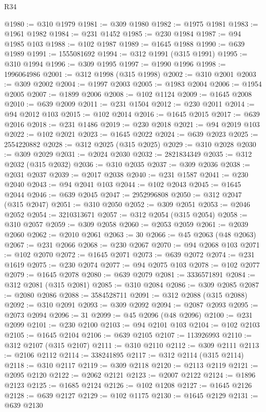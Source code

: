 \begin{lexlean}{R34}
\begin{coremodule}
@1980 := @310 @1979
@1981 := @309 @1980
@1982 := @1975 @1981
@1983 := @1961 @1982
@1984 := @231 @1452
@1985 := @230 @1984
@1987 := @94 @1985 @103
@1988 := @102 @1987
@1989 := @1645 @1988
@1990 := @639 @1989
@1991 := 1555081692
@1994 := @312 @1991 (@315 @1991)
@1995 := @310 @1994
@1996 := @309 @1995
@1997 := @1990 @1996
@1998 := 1996064986
@2001 := @312 @1998 (@315 @1998)
@2002 := @310 @2001
@2003 := @309 @2002
@2004 := @1997 @2003
@2005 := @1983 @2004
@2006 := @1954 @2005
@2007 := @1899 @2006
@2008 := @102 @1124
@2009 := @1645 @2008
@2010 := @639 @2009
@2011 := @231 @1504
@2012 := @230 @2011
@2014 := @94 @2012 @103
@2015 := @102 @2014
@2016 := @1645 @2015
@2017 := @639 @2016
@2018 := @231 @1486
@2019 := @230 @2018
@2021 := @94 @2019 @103
@2022 := @102 @2021
@2023 := @1645 @2022
@2024 := @639 @2023
@2025 := 2554220882
@2028 := @312 @2025 (@315 @2025)
@2029 := @310 @2028
@2030 := @309 @2029
@2031 := @2024 @2030
@2032 := 2821834349
@2035 := @312 @2032 (@315 @2032)
@2036 := @310 @2035
@2037 := @309 @2036
@2038 := @2031 @2037
@2039 := @2017 @2038
@2040 := @231 @1587
@2041 := @230 @2040
@2043 := @94 @2041 @103
@2044 := @102 @2043
@2045 := @1645 @2044
@2046 := @639 @2045
@2047 := 2952996808
@2050 := @312 @2047 (@315 @2047)
@2051 := @310 @2050
@2052 := @309 @2051
@2053 := @2046 @2052
@2054 := 3210313671
@2057 := @312 @2054 (@315 @2054)
@2058 := @310 @2057
@2059 := @309 @2058
@2060 := @2053 @2059
@2061 := @2039 @2060
@2062 := @2010 @2061
@2063 := 30
@2066 := @45 @2063 (@48 @2063)
@2067 := @231 @2066
@2068 := @230 @2067
@2070 := @94 @2068 @103
@2071 := @102 @2070
@2072 := @1645 @2071
@2073 := @639 @2072
@2074 := @231 @1619
@2075 := @230 @2074
@2077 := @94 @2075 @103
@2078 := @102 @2077
@2079 := @1645 @2078
@2080 := @639 @2079
@2081 := 3336571891
@2084 := @312 @2081 (@315 @2081)
@2085 := @310 @2084
@2086 := @309 @2085
@2087 := @2080 @2086
@2088 := 3584528711
@2091 := @312 @2088 (@315 @2088)
@2092 := @310 @2091
@2093 := @309 @2092
@2094 := @2087 @2093
@2095 := @2073 @2094
@2096 := 31
@2099 := @45 @2096 (@48 @2096)
@2100 := @231 @2099
@2101 := @230 @2100
@2103 := @94 @2101 @103
@2104 := @102 @2103
@2105 := @1645 @2104
@2106 := @639 @2105
@2107 := 113926993
@2110 := @312 @2107 (@315 @2107)
@2111 := @310 @2110
@2112 := @309 @2111
@2113 := @2106 @2112
@2114 := 338241895
@2117 := @312 @2114 (@315 @2114)
@2118 := @310 @2117
@2119 := @309 @2118
@2120 := @2113 @2119
@2121 := @2095 @2120
@2122 := @2062 @2121
@2123 := @2007 @2122
@2124 := @1896 @2123
@2125 := @1685 @2124
@2126 := @102 @1208
@2127 := @1645 @2126
@2128 := @639 @2127
@2129 := @102 @1175
@2130 := @1645 @2129
@2131 := @639 @2130

\end{coremodule}
\end{lexlean}
